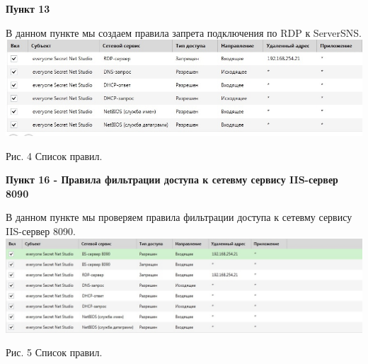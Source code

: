\documentclass[a4paper,14pt]{extarticle}
\begin{document}
    \textbf{Пункт 13}
    \begin{center}
        В данном пункте мы создаем правила запрета подключения по RDP к ServerSNS.
        \includegraphics[scale=0.55]{pics/13.jpg}

        Рис. 4 Список правил.
    \end{center}

    \newpage
    \textbf{Пункт 16 - Правила фильтрации доступа к сетевму сервису IIS-сервер 8090}
    \begin{center}
        В данном пункте мы проверяем правила фильтрации доступа к сетевму сервису IIS-сервер 8090.
        \includegraphics[scale=0.45]{pics/16.jpg}

       Рис. 5 Список правил.
    \end{center}
    
\end{document}
